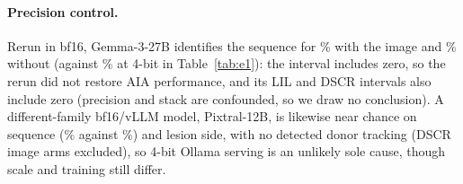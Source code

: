 \documentclass[conference]{IEEEtran}
\begin{document}
\paragraph{Precision control.} Rerun in bf16, Gemma-3-27B identifies the sequence for \vfourEoneOwnAIAGemmaTwentySevenBf{}\% with the image and \vfourEoneTextAIAGemmaTwentySevenBf{}\% without (against \vfourEoneOwnAIAGemmaTwentySeven{}\% at 4-bit in Table~\ref{tab:e1}): the interval includes zero, so the rerun did not restore AIA performance, and its LIL and DSCR intervals also include zero (precision and stack are confounded, so we draw no conclusion). A different-family bf16/vLLM model, Pixtral-12B, is likewise near chance on sequence (\vfourEoneOwnAIAPixtral{}\% against \vfourEoneTextAIAPixtral{}\%) and lesion side, with no detected donor tracking (DSCR image arms excluded), so 4-bit Ollama serving is an unlikely sole cause, though scale and training still differ.
\end{document}
